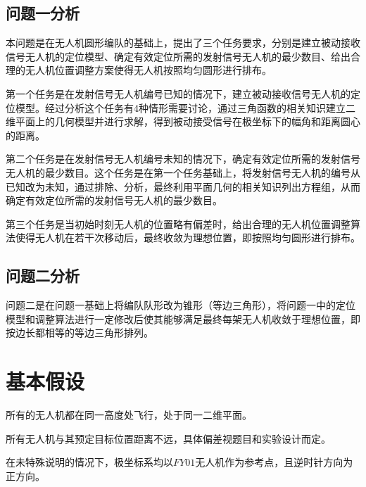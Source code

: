 \documentclass[withoutpreface,bwprint]{cumcmthesis} %
\begin{document}
\subsection{问题一分析}

本问题是在无人机圆形编队的基础上，提出了三个任务要求，分别是建立被动接收信号无人机的定位模型、确定有效定位所需的发射信号无人机的最少数目、给出合理的无人机位置调整方案使得无人机按照均匀圆形进行排布。

第一个任务是在发射信号无人机编号已知的情况下，建立被动接收信号无人机的定位模型。经过分析这个任务有4种情形需要讨论，通过三角函数的相关知识建立二维平面上的几何模型并进行求解，得到被动接受信号在极坐标下的幅角和距离圆心的距离。

第二个任务是在发射信号无人机编号未知的情况下，确定有效定位所需的发射信号无人机的最少数目。这个任务是在第一个任务基础上，将发射信号无人机的编号从已知改为未知，通过排除、分析，最终利用平面几何的相关知识列出方程组，从而确定有效定位所需的发射信号无人机的最少数目。

第三个任务是当初始时刻无人机的位置略有偏差时，给出合理的无人机位置调整算法使得无人机在若干次移动后，最终收敛为理想位置，即按照均匀圆形进行排布。

\subsection{问题二分析}
问题二是在问题一基础上将编队队形改为锥形（等边三角形），将问题一中的定位模型和调整算法进行一定修改后使其能够满足最终每架无人机收敛于理想位置，即按边长都相等的等边三角形排列。




\section{基本假设}

\begin{assumption}
    所有的无人机都在同一高度处飞行，处于同一二维平面。
    \label{asu:001}
\end{assumption}


\begin{assumption}
    所有无人机与其预定目标位置距离不远，具体偏差视题目和实验设计而定。
    \label{asu:002}
\end{assumption}

\begin{assumption}
    在未特殊说明的情况下，极坐标系均以$FY01$无人机作为参考点，且逆时针方向为正方向。
    \label{asu:003}
\end{assumption}
\end{document}

